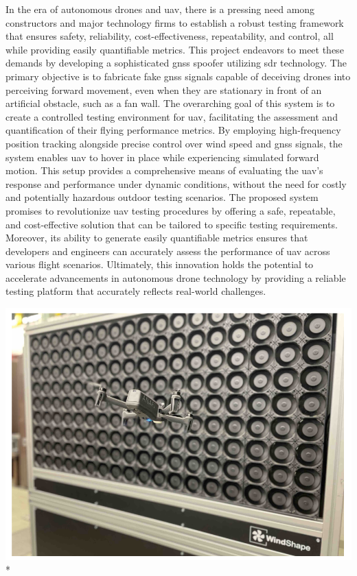 \begin{spacing}{0.956}
	\vspace{0.5cm}

	In the era of autonomous drones and \gls{uav}, there is a pressing need among constructors and major technology firms to establish a robust testing framework that ensures safety, reliability, cost-effectiveness, repeatability, and control, all while providing easily quantifiable metrics. This project endeavors to meet these demands by developing a sophisticated \gls{gnss} spoofer utilizing \gls{sdr} technology. The primary objective is to fabricate fake \gls{gnss} signals capable of deceiving drones into perceiving forward movement, even when they are stationary in front of an artificial obstacle, such as a fan wall. The overarching goal of this system is to create a controlled testing environment for \gls{uav}, facilitating the assessment and quantification of their flying performance metrics. By employing high-frequency position tracking alongside precise control over wind speed and \gls{gnss} signals, the system enables \gls{uav} to hover in place while experiencing simulated forward motion. This setup provides a comprehensive means of evaluating the \gls{uav}'s response and performance under dynamic conditions, without the need for costly and potentially hazardous outdoor testing scenarios. The proposed system promises to revolutionize \gls{uav} testing procedures by offering a safe, repeatable, and cost-effective solution that can be tailored to specific testing requirements. Moreover, its ability to generate easily quantifiable metrics ensures that developers and engineers can accurately assess the performance of \gls{uav} across various flight scenarios. Ultimately, this innovation holds the potential to accelerate advancements in autonomous drone technology by providing a reliable testing platform that accurately reflects real-world challenges.

	\vfill
	\begin{center}
		{\includegraphics[width=0.5\linewidth]{figures/windshaper.png}}\\*
		\vfill


\end{center}
\end{spacing}
